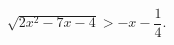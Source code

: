 \begin{ex}[type=inequality]
	\begin{condition}
		$ \sqrt{2x^2 - 7x - 4}>-x-\dfrac{1}{4}.$
	\end{condition}
\end{ex}